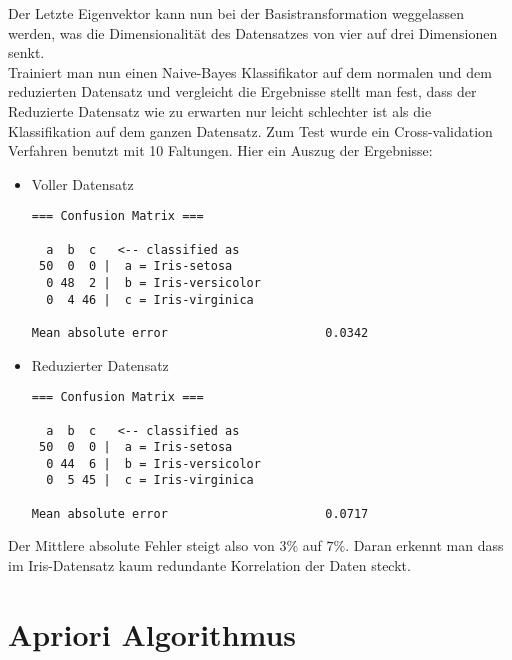 \documentclass[a4paper]{article}
\begin{document}
Der Letzte Eigenvektor kann nun bei der Basistransformation weggelassen werden, was die Dimensionalität des Datensatzes von vier auf drei Dimensionen senkt.\\
Trainiert man nun einen Naive-Bayes Klassifikator auf dem normalen und dem reduzierten Datensatz und vergleicht die Ergebnisse stellt man fest, dass der Reduzierte Datensatz wie zu erwarten nur leicht schlechter ist als die Klassifikation auf dem ganzen Datensatz. Zum Test wurde ein Cross-validation Verfahren benutzt mit 10 Faltungen. Hier ein Auszug der Ergebnisse:
\begin{itemize}
\item Voller Datensatz
\begin{lstlisting}
=== Confusion Matrix ===

  a  b  c   <-- classified as
 50  0  0 |  a = Iris-setosa
  0 48  2 |  b = Iris-versicolor
  0  4 46 |  c = Iris-virginica
  
Mean absolute error                      0.0342
\end{lstlisting}
\item Reduzierter Datensatz
\begin{lstlisting}
=== Confusion Matrix ===

  a  b  c   <-- classified as
 50  0  0 |  a = Iris-setosa
  0 44  6 |  b = Iris-versicolor
  0  5 45 |  c = Iris-virginica
  
Mean absolute error                      0.0717
\end{lstlisting}
\end{itemize}
Der Mittlere absolute Fehler steigt also von $3\%$ auf $7\%$. Daran erkennt man dass im Iris-Datensatz kaum redundante Korrelation der Daten steckt.
\section{Apriori Algorithmus}
\end{document}

